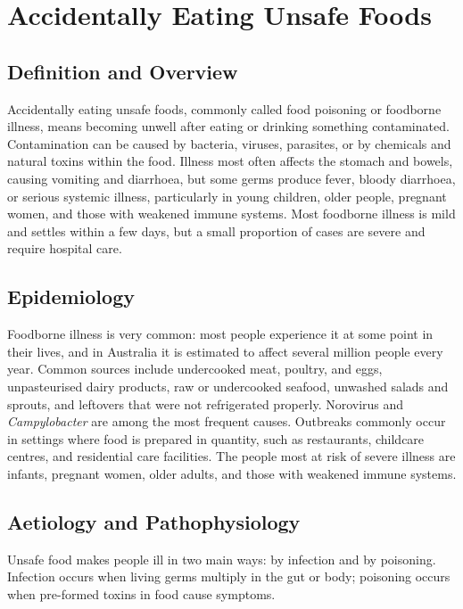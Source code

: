 \chapter{Accidentally Eating Unsafe Foods}

\section*{Definition and Overview}
Accidentally eating unsafe foods, commonly called food poisoning or foodborne illness, means becoming unwell after eating or drinking something contaminated. Contamination can be caused by bacteria, viruses, parasites, or by chemicals and natural toxins within the food. Illness most often affects the stomach and bowels, causing vomiting and diarrhoea, but some germs produce fever, bloody diarrhoea, or serious systemic illness, particularly in young children, older people, pregnant women, and those with weakened immune systems. Most foodborne illness is mild and settles within a few days, but a small proportion of cases are severe and require hospital care.

\section*{Epidemiology}
Foodborne illness is very common: most people experience it at some point in their lives, and in Australia it is estimated to affect several million people every year. Common sources include undercooked meat, poultry, and eggs, unpasteurised dairy products, raw or undercooked seafood, unwashed salads and sprouts, and leftovers that were not refrigerated properly. Norovirus and \textit{Campylobacter} are among the most frequent causes. Outbreaks commonly occur in settings where food is prepared in quantity, such as restaurants, childcare centres, and residential care facilities. The people most at risk of severe illness are infants, pregnant women, older adults, and those with weakened immune systems.

\section*{Aetiology and Pathophysiology}
Unsafe food makes people ill in two main ways: by infection and by poisoning. Infection occurs when living germs multiply in the gut or body; poisoning occurs when pre-formed toxins in food cause symptoms.

